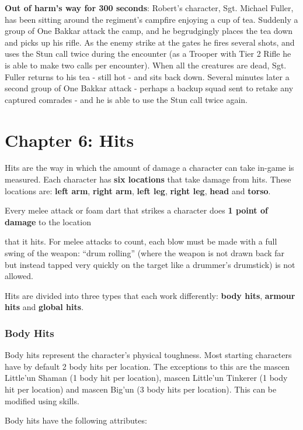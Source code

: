 \textbf{Out of harm's way for 300 seconds}: Robert's character, Sgt. Michael Fuller, has been sitting around the regiment's campfire enjoying a cup of tea. Suddenly a group of One Bakkar attack the camp, and he begrudgingly places the tea down and picks up his rifle. As the enemy strike at the gates he fires several shots, and uses the Stun call twice during the encounter (as a Trooper with Tier 2 Rifle he is able to make two calls per encounter). When all the creatures are dead, Sgt. Fuller returns to his tea - still hot - and sits back down. Several minutes later a second group of One Bakkar attack - perhaps a backup squad sent to retake any captured comrades - and he is able to use the Stun call twice again.

\chapter{Chapter 6: Hits}

Hits are the way in which the amount of damage a character can take in-game is measured. Each character has \textbf{six locations} that take damage from hits. These locations are: \textbf{left arm}, \textbf{right arm}, \textbf{left leg}, \textbf{right leg}, \textbf{head} and \textbf{torso}.

Every melee attack or foam dart that strikes a character does \textbf{1 point of damage} to the location

that it hits. For melee attacks to count, each blow must be made with a full swing of the weapon: ``drum rolling'' (where the weapon is not drawn back far but instead tapped very quickly on the target like a drummer's drumstick) is not allowed.

Hits are divided into three types that each work differently: \textbf{body hits}, \textbf{armour hits} and \textbf{global hits}.

\subsection{Body Hits}

Body hits represent the character's physical toughness. Most starting characters have by default 2 body hits per location. The exceptions to this are the mascen Little'un Shaman (1 body hit per location), mascen Little'un Tinkerer (1 body hit per location) and mascen Big'un (3 body hits per location). This can be modified using skills.

Body hits have the following attributes:

